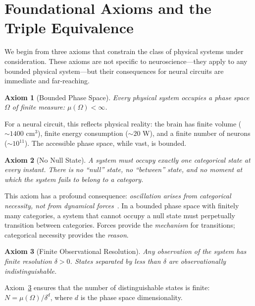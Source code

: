 \documentclass[twocolumn,10pt]{article}
\newtheorem{axiom}{Axiom}
\theoremstyle{remark}
\begin{document}
\section{Foundational Axioms and the Triple Equivalence}
\label{sec:axioms}

We begin from three axioms that constrain the class of physical systems under consideration. These axioms are not specific to neuroscience---they apply to any bounded physical system---but their consequences for neural circuits are immediate and far-reaching.

\begin{axiom}[Bounded Phase Space]
\label{ax:bounded}
Every physical system occupies a phase space $\Omega$ of finite measure: $\mu(\Omega) < \infty$.
\end{axiom}

For a neural circuit, this reflects physical reality: the brain has finite volume ($\sim\!1400$ cm$^3$), finite energy consumption ($\sim\!20$ W), and a finite number of neurons ($\sim\!10^{11}$). The accessible phase space, while vast, is bounded.

\begin{axiom}[No Null State]
\label{ax:nonull}
A system must occupy exactly one categorical state at every instant. There is no ``null'' state, no ``between'' state, and no moment at which the system fails to belong to a category.
\end{axiom}

This axiom has a profound consequence: \emph{oscillation arises from categorical necessity, not from dynamical forces}~\citep{buzsaki2006rhythms}. In a bounded phase space with finitely many categories, a system that cannot occupy a null state must perpetually transition between categories. Forces provide the \emph{mechanism} for transitions; categorical necessity provides the \emph{reason}.

\begin{axiom}[Finite Observational Resolution]
\label{ax:resolution}
Any observation of the system has finite resolution $\delta > 0$. States separated by less than $\delta$ are observationally indistinguishable.
\end{axiom}

Axiom~\ref{ax:resolution} ensures that the number of distinguishable states is finite: $N = \mu(\Omega)/\delta^d$, where $d$ is the phase space dimensionality.
\end{document}
